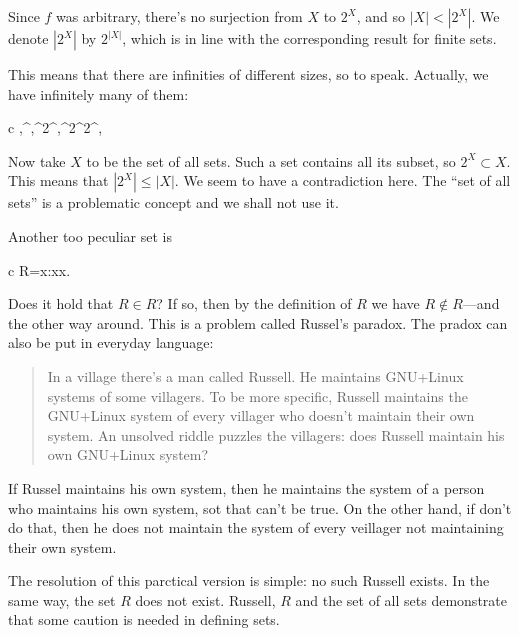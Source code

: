 \documentclass[11pt,oneside,%
]{memoir}
\newenvironment{eqna}{\begin{IEEEeqnarray}{c}}{\end{IEEEeqnarray}\ignorespacesafterend}
\newcommand{\NN}{\mathbb{N}}
\begin{document}
Since \(f\) was arbitrary, there's no surjection from \(X\) to \(2^X\), and so \(|X|<|2^X|\). We denote \(|2^X|\) by \(2^{|X|}\), which is in line with the corresponding result for finite sets.

This means that there are infinities of different sizes, so to speak. Actually, we have infinitely many of them:
\begin{eqna}
    \NN,^\NN,^{2^\NN},^{2^{2^\NN}},\: \dotsc
\end{eqna}

Now take \(X\) to be the set of all sets. Such a set contains all its subset, so \(2^X\subset X\). This means that \(|2^X|\leq|X|\). We seem to have a contradiction here. The ``set of all sets'' is a problematic concept and we shall not use it.

Another too peculiar set is
\begin{eqna}
    R=\lbrace x:x\notin x\rbrace.
\end{eqna}
Does it hold that \(R\in R\)? If so, then by the definition of \(R\) we have \(R\notin R\)---and the other way around. This is a problem called Russel's paradox. The pradox can also be put in everyday language:
\begin{quote}
    In a village there's a man called Russell. He maintains GNU+Linux systems of some villagers. To be more specific, Russell maintains the GNU+Linux system of every villager who doesn't maintain their own system. An unsolved riddle puzzles the villagers: does Russell maintain his own GNU+Linux system?
\end{quote}
If Russel maintains his own system, then he maintains the system of a person who maintains his own system, sot that can't be true. On the other hand, if don't do that, then he does not maintain the system of every veillager not maintaining their own system.

The resolution of this parctical version is simple: no such Russell exists. In the same way, the set \(R\) does not exist. Russell, \(R\) and the set of all sets demonstrate that some caution is needed in defining sets.
\end{document}
